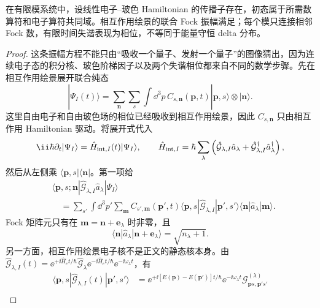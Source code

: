 \begin{proposition}[线性玻色耦合的振幅邻接层级]
在有限模系统中，设线性电子--玻色 Hamiltonian 的传播子存在，初态属于所需数算符和电子算符共同域。相互作用绘景的联合 Fock 振幅满足；每个模只连接相邻 Fock 数，有限时间失谐表现为相位，不等同于能量守恒 delta 分布。
\end{proposition}
\begin{proof}
这条振幅方程不能只由“吸收一个量子、发射一个量子”的图像猜出，因为连续电子态的积分核、玻色阶梯因子以及两个失谐相位都来自不同的数学步骤。先在相互作用绘景展开联合纯态
\begin{equation*}
 |\Psi_I(t)\rangle
 =\sum_{\mathbf n}\sum_s\int\dd^3p\,
 C_{s,\mathbf n}(\mathbf p,t)
 |\mathbf p,s\rangle\otimes|\mathbf n\rangle .
\end{equation*}
这里自由电子和自由玻色场的相位已经吸收到相互作用绘景，因此 $C_{s,\mathbf n}$ 只由相互作用 Hamiltonian 驱动。将展开式代入
\begin{equation*}
 \ii\hbar\partial_t|\Psi_I\rangle
 =\hat H_{{\rm int},I}(t)|\Psi_I\rangle,
 \qquad
 \hat H_{{\rm int},I}
 =\hbar\sum_\lambda
 \left(\hat{\mathcal G}_{\lambda,I}\hat a_\lambda
 +\hat{\mathcal G}_{\lambda,I}^\dagger\hat a_\lambda^\dagger\right),
\end{equation*}
然后从左侧乘 $\langle\mathbf p,s|\langle\mathbf n|$。第一项给
\begin{align*}
 &\langle\mathbf p,s;\mathbf n|
 \hat{\mathcal G}_{\lambda,I}\hat a_\lambda
 |\Psi_I\rangle\\
 &\quad=\sum_{s'}\int\dd^3p'\sum_{\mathbf m}
 C_{s',\mathbf m}(\mathbf p',t)
 \langle\mathbf p,s|\hat{\mathcal G}_{\lambda,I}|\mathbf p',s'\rangle
 \langle\mathbf n|\hat a_\lambda|\mathbf m\rangle .
\end{align*}
Fock 矩阵元只有在 $\mathbf m=\mathbf n+\mathbf e_\lambda$ 时非零，且
\begin{equation*}
 \langle\mathbf n|\hat a_\lambda|
 \mathbf n+\mathbf e_\lambda\rangle
 =\sqrt{n_\lambda+1}.
\end{equation*}
另一方面，相互作用绘景电子核不是正文的静态核本身。由
$\hat{\mathcal G}_{\lambda,I}(t)
 =\ee^{+\ii\hat H_e t/\hbar}\hat{\mathcal G}_\lambda
 \ee^{-\ii\hat H_e t/\hbar}\ee^{-\ii\omega_\lambda t}$，有
\begin{align*}
 \langle\mathbf p,s|\hat{\mathcal G}_{\lambda,I}(t)|\mathbf p',s'\rangle
 &=\ee^{+\ii[E(\mathbf p)-E(\mathbf p')]t/\hbar}
 \ee^{-\ii\omega_\lambda t}
 \mathcal G^{(\lambda)}_{\mathbf p s,\mathbf p's'}\\

\end{align*}
\end{proof}
